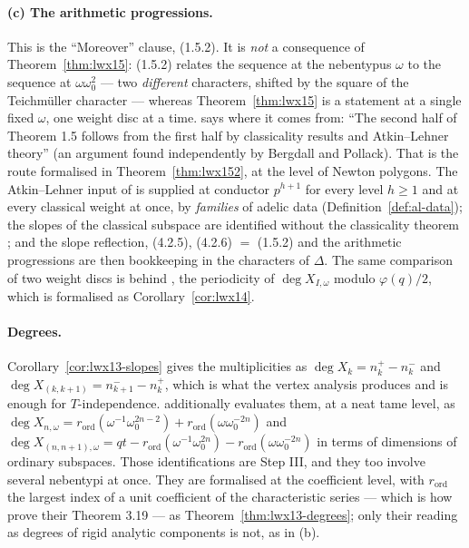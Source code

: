 \paragraph{(c) The arithmetic progressions.}  This is the ``Moreover'' clause, (1.5.2).  It is
\emph{not} a consequence of Theorem~\ref{thm:lwx15}: (1.5.2) relates the sequence at the
nebentypus $\omega$ to the sequence at $\omega\omega_0^{2}$ --- two \emph{different} characters,
shifted by the square of the Teichm\"uller character --- whereas Theorem~\ref{thm:lwx15} is a
statement at a single fixed $\omega$, one weight disc at a time.  \cite[Remark 1.6(4)]{LWX} says
where it comes from: ``The second half of Theorem 1.5 follows from the first half by classicality
results and Atkin--Lehner theory'' (an argument found independently by Bergdall and Pollack).
That is the route formalised in Theorem~\ref{thm:lwx152}, at the level of Newton polygons.  The
Atkin--Lehner input of \cite[\S3.23 Step I]{LWX} is supplied at conductor $p^{h+1}$ for every
level $h \geq 1$ and at every classical weight at once, by \emph{families} of adelic data
(Definition~\ref{def:al-data}); the slopes of the classical subspace are identified without the
classicality theorem \cite[Proposition 2.15]{LWX}; and the slope reflection, (4.2.5),
(4.2.6) $=$ (1.5.2) and the arithmetic progressions are then bookkeeping in the characters of
$\Delta$.  The same comparison of two weight discs is behind \cite[Corollary 1.4]{LWX}, the
periodicity of $\deg X_{I,\omega}$ modulo $\varphi(q)/2$, which is formalised as
Corollary~\ref{cor:lwx14}.

\paragraph{Degrees.}  Corollary~\ref{cor:lwx13-slopes} gives the multiplicities as
$\deg X_k = n_k^{+} - n_k^{-}$ and $\deg X_{(k,k+1)} = n_{k+1}^{-} - n_k^{+}$, which is what the
vertex analysis produces and is enough for $T$-independence.  \cite[Theorem 1.3]{LWX} additionally
evaluates them, at a neat tame level, as
$\deg X_{n,\omega} = r_{\mathrm{ord}}(\omega^{-1}\omega_0^{2n-2}) + r_{\mathrm{ord}}(\omega\omega_0^{-2n})$
and $\deg X_{(n,n+1),\omega} = qt - r_{\mathrm{ord}}(\omega^{-1}\omega_0^{2n}) -
r_{\mathrm{ord}}(\omega\omega_0^{-2n})$ in terms of dimensions of ordinary subspaces.  Those
identifications are Step III, and they too involve several nebentypi at once.  They are formalised
at the coefficient level, with $r_{\mathrm{ord}}$ the largest index of a unit coefficient of the
characteristic series --- which is how \cite{LWX} prove their Theorem 3.19 --- as
Theorem~\ref{thm:lwx13-degrees}; only their reading as degrees of rigid analytic components is
not, as in (b).

